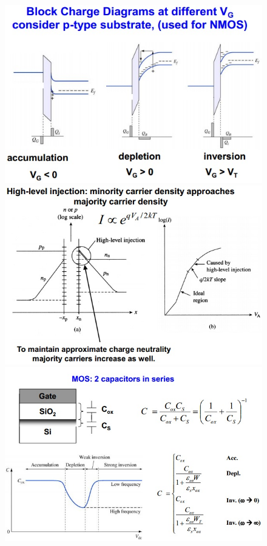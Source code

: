 \documentclass[11pt,landscape]{article}
\begin{document}
\begin{multicols}{3}
\begin{figure}[H]
\end{figure}
\begin{figure}[H]
	\includegraphics[scale=0.55]{./Images/2/MOSpdist.jpg}
	\includegraphics[scale=0.55]{./Images/2/Hinject.jpg}
    \includegraphics[scale=0.45]{./Images/2/MOSCAP.jpg}
\end{figure}

\end{multicols}
\end{document}
